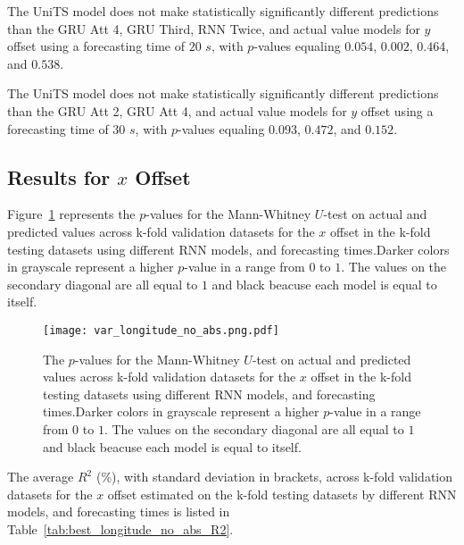 The UniTS model does not make statistically significantly different predictions than the GRU Att 4, GRU Third, RNN Twice, and actual value models for $y$ offset using a forecasting time of $20$ $s$, with $p$-values equaling $0.054$, $0.002$, $0.464$, and $0.538$.

The UniTS model does not make statistically significantly different predictions than the GRU Att 2, GRU Att 4, and actual value models for $y$ offset using a forecasting time of $30$ $s$, with $p$-values equaling $0.093$, $0.472$, and $0.152$.

\subsection{Results for $x$ Offset}

Figure~\ref{fig:var_longitude_no_abs.png} represents the $p$-values for the Mann-Whitney $U$-test on actual and predicted values across k-fold validation datasets for the $x$ offset in the k-fold testing datasets using different RNN models, and forecasting times.Darker colors in grayscale represent a higher $p$-value in a range from $0$ to $1$. The values on the secondary diagonal are all equal to $1$ and black beacuse each model is equal to itself.

\begin{figure}[!ht]
	\centering
	\texttt{[image: var\_longitude\_no\_abs.png.pdf]}
	\caption{The $p$-values for the Mann-Whitney $U$-test on actual and predicted values across k-fold validation datasets for the $x$ offset in the k-fold testing datasets using different RNN models, and forecasting times.Darker colors in grayscale represent a higher $p$-value in a range from $0$ to $1$. The values on the secondary diagonal are all equal to $1$ and black beacuse each model is equal to itself.}
	\label{fig:var_longitude_no_abs.png}
\end{figure}

The average $R^{2}$ (\%), with standard deviation in brackets, across k-fold validation datasets for the $x$ offset estimated on the k-fold testing datasets by different RNN models, and forecasting times is listed in Table~\ref{tab:best_longitude_no_abs_R2}.

